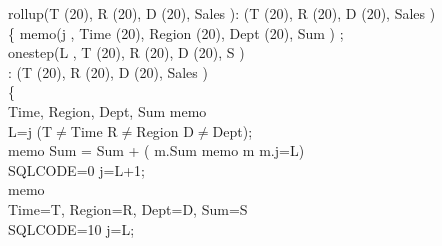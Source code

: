 {{  \begin{algorithm}[!htb]
    \begin{algorithmic}[1]
      \footnotesize
      \STATE{} rollup(T (20), R (20), \kw{}D (20), Sales ): (T (20), R (20), D (20), Sales )\\
      \STATE\{\hspace{.15cm} memo(j , Time (20), Region (20), \kw{}Dept (20), Sum ) ;\\
      \STATE\hspace{.3cm} onestep(L , T (20), R (20), \kw{}D (20), S )\\
      \hspace{.8cm}: (T (20), R (20), D (20), Sales )\\
      \STATE\hspace{.3cm}\{\hspace{.2cm}   \\
      \hspace{.8cm} Time, Region, Dept, Sum  memo\\
      \hspace{.8cm} L=j  (T$\neq$Time  R$\neq$Region  D$\neq$Dept);\\
      \STATE\hspace{.6cm} memo  Sum = Sum + ( m.Sum  memo  m  m.j=L)\\
      \hspace{.8cm} SQLCODE=0  j=L+1;\\
      \STATE\hspace{.6cm} memo\\
      \hspace{.8cm} Time=T, Region=R, Dept=D, Sum=S\\
      \hspace{.8cm} SQLCODE=10  j=L;\\

\end{algorithmic}
\end{algorithm}}}

